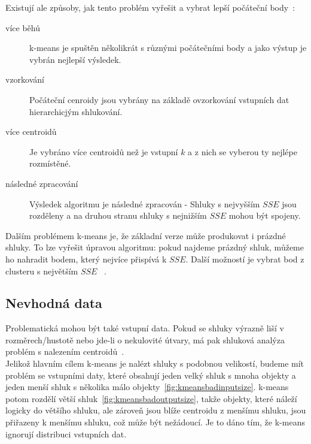 Existují ale způsoby, jak tento problém vyřešit a vybrat lepší počáteční body~\cite{Tan05}:
\begin{description}
\item[více běhů] k-means je spuštěn několikrát s různými počátečními body a jako výstup je vybrán nejlepší výsledek.
\item[vzorkování] Počáteční cenroidy jsou vybrány na základě ovzorkování vstupních dat hierarchicjým shlukování.
\item[více centroidů] Je vybráno více centroidů než je vstupní $k$ a z nich se vyberou ty nejlépe rozmístěné.
\item[následné zpracování] Výsledek algoritmu je následné zpracován - Shluky s nej\-vyš\-ším $SSE$ jsou rozděleny a na druhou stranu shluky s nejnižším $SSE$ mohou být spojeny.
\end{description} 

Dalším problémem k-means je, že základní verze může produkovat i prázdné shluky. To lze vyřešit úpravou algoritmu: pokud najdeme prázdný shluk, můžeme ho nahradit bodem, který nejvíce přispívá k $SSE$. Další možností je vybrat bod z clusteru s největším $SSE$ ~\cite{Tan05}.\\

\subsection{Nevhodná data}
Problematická mohou být také vstupní data. Pokud se shluky výrazně liší v rozměrech/hustotě nebo jde-li o nekulovité útvary, má pak shluková analýza problém s nalezením centroidů~\cite{Tan05}. \\

Jelikož hlavním cílem k-means je nalézt shluky s podobnou velikostí, budeme mít problém se vstupními daty, které obsahují jeden velký shluk s mnoha objekty a jeden menší shluk s několika málo objekty~\autoref{fig:kmeansbadinputsize}. k-means potom rozdělí větší shluk~\autoref{fig:kmeansbadoutputsize}, takže objekty, které náleží logicky do většího shluku, ale zároveň jsou blíže centroidu z menšímu shluku, jsou přiřazeny k menšímu shluku, což může být nežádoucí. Je to dáno tím, že k-means ignorují distribuci vstupních dat.

